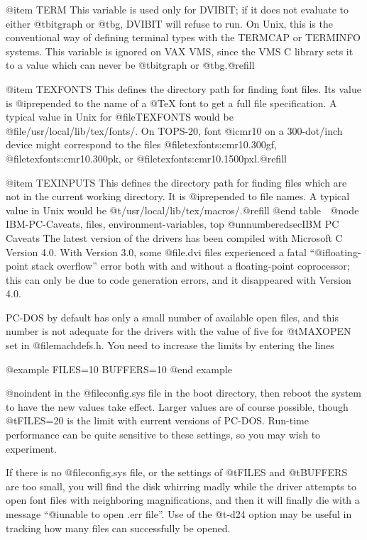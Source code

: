{@item TERM
This variable is used only for DVIBIT; if it does not
evaluate to either @t{bitgraph} or @t{bg}, DVIBIT will refuse
to run.  On Unix, this is the conventional way of defining
terminal types with the TERMCAP or TERMINFO systems.
This variable is ignored on VAX VMS, since the VMS C
library sets it to a value which can never be
@t{bitgraph} or @t{bg}.@refill

@item TEXFONTS
This defines the directory path for finding font files.  Its
value is @i{prepended} to the name of a @TeX{} font to get a
full file specification.  A typical value in Unix for
@file{TEXFONTS} would be @file{/usr/local/lib/tex/fonts/}.
On TOPS-20, font @i{cmr10} on a 300-dot/inch device might
correspond to the files @file{texfonts:cmr10.300gf},
@file{texfonts:cmr10.300pk}, or
@file{texfonts:cmr10.1500pxl}.@refill

@item TEXINPUTS
This defines the directory path for finding files which are
not in the current working directory.  It is @i{prepended} to
file names.  A typical value in Unix would be
@t{/usr/local/lib/tex/macros/}.@refill
@end table

@node IBM-PC-Caveats, files, environment-variables, top
@unnumberedsec{IBM PC Caveats}
The latest version of the drivers has been compiled with
Microsoft C Version 4.0.  With Version 3.0, some @file{.dvi}
files experienced a fatal ``@i{floating-point stack overflow}''
error both with and without a floating-point coprocessor; this
can only be due to code generation errors, and it disappeared
with Version 4.0.

PC-DOS by default has only a small number of available open
files, and this number is not adequate for the drivers with the
value of five for @t{MAXOPEN} set in @file{machdefs.h}.  You
need to increase the limits by entering the lines

@example
FILES=10
BUFFERS=10
@end example

@noindent
in the @file{config.sys} file in the boot directory, then reboot
the system to have the new values take effect.  Larger values are
of course possible, though @t{FILES=20} is the limit with current
versions of PC-DOS.   Run-time performance can be quite
sensitive to these settings, so you may wish to experiment.

If there is no @file{config.sys} file, or the settings of
@t{FILES} and @t{BUFFERS} are too small, you will find the disk
whirring madly while the driver attempts to open font files with
neighboring magnifications, and then it will finally die with a
message ``@i{unable to open .err file}''.  Use of the @t{-d24}
option may be useful in tracking how many files can successfully
be opened.

}
